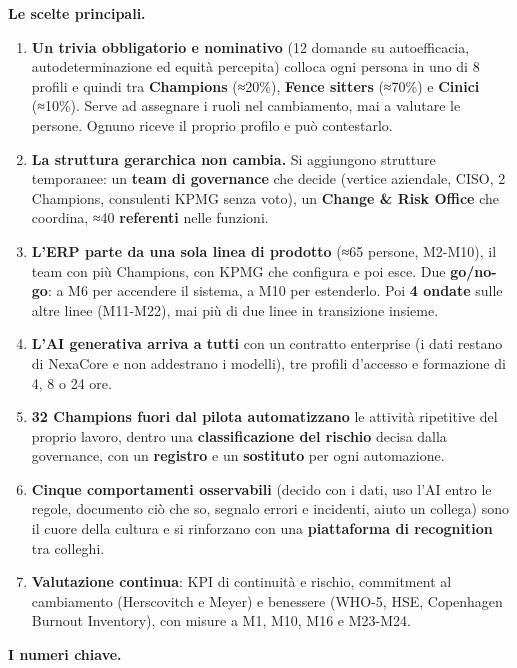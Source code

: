 \documentclass[11pt,a4paper]{article}
\begin{document}
\textbf{Le scelte principali.}
\begin{enumerate}
\item \textbf{Un trivia obbligatorio e nominativo} (12 domande su autoefficacia, autodeterminazione ed equità percepita) colloca ogni persona in uno di 8 profili e quindi tra \textbf{Champions} (≈20\%), \textbf{Fence sitters} (≈70\%) e \textbf{Cinici} (≈10\%). Serve ad assegnare i ruoli nel cambiamento, mai a valutare le persone. Ognuno riceve il proprio profilo e può contestarlo.
\item \textbf{La struttura gerarchica non cambia.} Si aggiungono strutture temporanee: un \textbf{team di governance} che decide (vertice aziendale, CISO, 2 Champions, consulenti KPMG senza voto), un \textbf{Change \& Risk Office} che coordina, ≈40 \textbf{referenti} nelle funzioni.
\item \textbf{L'ERP parte da una sola linea di prodotto} (≈65 persone, M2-M10), il team con più Champions, con KPMG che configura e poi esce. Due \textbf{go/no-go}: a M6 per accendere il sistema, a M10 per estenderlo. Poi \textbf{4 ondate} sulle altre linee (M11-M22), mai più di due linee in transizione insieme.
\item \textbf{L'AI generativa arriva a tutti} con un contratto enterprise (i dati restano di NexaCore e non addestrano i modelli), tre profili d'accesso e formazione di 4, 8 o 24 ore.
\item \textbf{32 Champions fuori dal pilota automatizzano} le attività ripetitive del proprio lavoro, dentro una \textbf{classificazione del rischio} decisa dalla governance, con un \textbf{registro} e un \textbf{sostituto} per ogni automazione.
\item \textbf{Cinque comportamenti osservabili} (decido con i dati, uso l'AI entro le regole, documento ciò che so, segnalo errori e incidenti, aiuto un collega) sono il cuore della cultura e si rinforzano con una \textbf{piattaforma di recognition} tra colleghi.
\item \textbf{Valutazione continua}: KPI di continuità e rischio, commitment al cambiamento (Herscovitch e Meyer) e benessere (WHO-5, HSE, Copenhagen Burnout Inventory), con misure a M1, M10, M16 e M23-M24.
\end{enumerate}

\textbf{I numeri chiave.}
\end{document}
